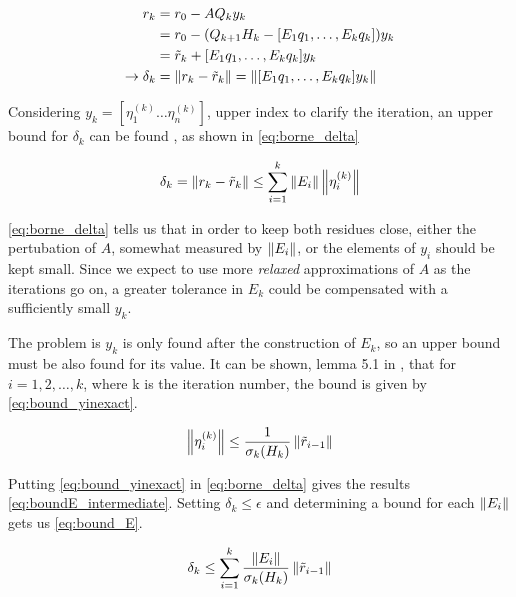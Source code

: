     \begin{align}\label{eq:res_relation}
    \begin{split}
        r_{k} &= r_{0} - AQ_{k}y_{k}\\ 
        &= r_{0} - (Q_{k+1}H_{k} - [E_{1}q_{1},\dots , E_{k}q_{k}])y_{k}\\
        &= \tilde{r}_{k} +[E_{1}q_{1},\dots , E_{k}q_{k}]y_{k}\\
        \rightarrow \delta_{k} &= \left\lVert r_{k} - \tilde{r}_{k}\right\rVert  = \left\lVert[E_{1}q_{1},\dots , E_{k}q_{k}]y_{k}\right\rVert
    \end{split}
    \end{align}

    Considering $y_{k} = [\eta_{1}^{(k)} \dots \eta_{n}^{(k)} ] $, upper index to clarify the iteration, an upper bound for $\delta_{k}$ can be found \cite{simoncini2003theory}, as shown in \ref{eq:borne_delta}

    \begin{equation}\label{eq:borne_delta}
        \delta_{k} = \left\lVert r_{k} - \tilde{r}_{k}\right\rVert \leq \sum_{i=1}^{k} \left\lVert E_{i}\right\rVert \left\lVert\eta_{i}^{(k)}\right\rVert
    \end{equation}
    
    \ref{eq:borne_delta} tells us that in order to keep both residues close, either the pertubation of $A$, somewhat measured by $\left\lVert E_{i}\right\rVert$, or the elements of $y_{i}$ should be kept small. Since we expect to use more \textit{relaxed} approximations of $A$ as the iterations go on, a greater tolerance in $E_{k}$ could be compensated with a sufficiently small $y_{k}$.

    
    The problem is $y_{k}$ is only found after the construction of $E_{k}$, so an upper bound must be also found for its value.
    It can be shown, lemma 5.1 in \cite{simoncini2003theory}, that for $i = 1,2,\dots,k$, where k is the iteration number, the bound is given by \ref{eq:bound_yinexact}.

    \begin{equation}\label{eq:bound_yinexact}
        \left\lVert\eta_{i}^{(k)}\right\rVert \leq \frac{1}{\sigma_{k}(H_{k})} \left\lVert\tilde{r}_{i-1}\right\rVert
    \end{equation}

    Putting \ref{eq:bound_yinexact} in \ref{eq:borne_delta} gives the results \ref{eq:boundE_intermediate}. Setting $\delta_{k} \leq \epsilon$ and determining a bound for each $\left\lVert E_{i}\right\rVert$ gets us \ref{eq:bound_E}.


    \begin{equation}\label{eq:boundE_intermediate}
        \delta_{k} \leq \sum_{i=1}^{k} \frac{\left\lVert E_{i}\right\rVert}{\sigma_{k}(H_{k})}\left\lVert\tilde{r}_{i-1}\right\rVert
    \end{equation}


